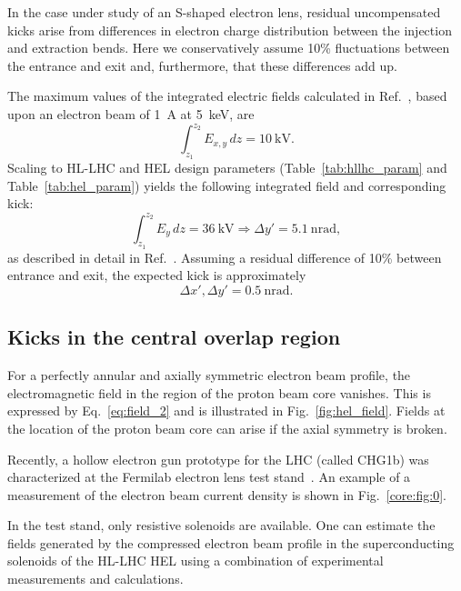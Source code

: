 \documentclass[%
 reprint,
 amsmath,amssymb,
 aps,
prstab,
longbibliography,
]{revtex4-1}
\newcommand{\q}[2]{\ensuremath{#1\ \mathrm{#2}}} %
\begin{document}
In the case under study of an S-shaped electron lens, residual
uncompensated kicks arise from differences in electron charge
distribution between the injection and extraction bends. Here we
conservatively assume 10\% fluctuations between the entrance and exit
and, furthermore, that these differences add up.

The maximum values of the integrated electric fields calculated in
Ref.~\cite{hel_bends_stancari}, based upon an electron beam of 1~A at
5~keV, are
%
\begin{equation}
  \int_{z_1}^{z_2} E_{x,y} \, dz= \q{10}{kV}.
\end{equation}
%
Scaling to HL-LHC and HEL design parameters
(Table~\ref{tab:hllhc_param} and Table~\ref{tab:hel_param}) yields the
following integrated field and corresponding kick:
%
\begin{equation}
  \int_{z_1}^{z_2} E_{y} \, dz = \q{36}{kV} \Rightarrow \Delta y' = \q{5.1}{nrad},
\end{equation}
%
as described in detail in
Ref.~\cite{md_sim_hel_res_ex_fitterer}. Assuming a residual difference
of 10\% between entrance and exit, the expected kick is approximately
%
\begin{equation}
  \label{eqn:kick_bends}
  \Delta x', \Delta y' = \q{0.5}{nrad}.
\end{equation}


\subsection{Kicks in the central overlap region}
\label{core:sec:2}

For a perfectly annular and axially symmetric electron beam profile,
the electromagnetic field in the region of the proton beam core
vanishes. This is expressed by Eq.~\ref{eq:field_2} and is illustrated
in Fig.~\ref{fig:hel_field}. Fields at the location of the proton beam
core can arise if the axial symmetry is broken.

Recently, a hollow electron gun prototype for the LHC (called CHG1b)
was characterized at the Fermilab electron lens test
stand~\cite{hel_test_stand_fnal}. An example of a measurement of the
electron beam current density is shown in Fig.~\ref{core:fig:0}.

In the test stand, only resistive solenoids are available. One can
estimate the fields generated by the compressed electron beam profile
in the superconducting solenoids of the HL-LHC HEL using a combination
of experimental measurements and calculations.
\end{document}
